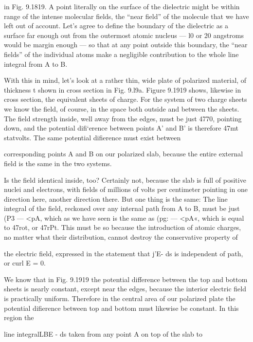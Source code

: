 {%
in Fig. 9.1819. A point literally on the surface of the dielectric might
be within range of the intense molecular fields, the ``near field'' of
the molecule that we have left out of account. Let's agree to define
the boundary of the dielectric as a surface far enough out from the
outermost atomic nucleus --- l0 or 20 angstroms would be margin
enough --- so that at any point outside this boundary, the ``near fields''
of the individual atoms make a negligible contribution to the whole
line integral from A to B.

With this in mind, let's look at a rather thin, wide plate of polarized
material, of thickness t shown in cross section in Fig. 9.l9a. Figure
9.1919 shows, likewise in cross section, the equivalent sheets of charge.
For the system of two charge sheets we know the field, of course, in
the space both outside and between the sheets. The field strength
inside, well away from the edges, must be just 4770, pointing down,
and the potential difi‘erence between points A' and B' is therefore
47mt statvolts. The same potential difierence must exist between

corresponding points A and B on our polarized slab, because the
entire external field is the same in the two systems.

Is the field identical inside, too? Certainly not, because the slab
is full of positive nuclei and electrons, with fields of millions of volts
per centimeter pointing in one direction here, another direction there.
But one thing is the same: The line integral of the field, reckoned over
any internal path from A to B, must be just (P3  ---  <pA, which as we have
seen is the same as (pg:  ---  <pA«, which is equal to 47rot, or 47rPt. This
must be so because the introduction of atomic charges, no matter
what their distribution, cannot destroy the conservative property of

the electric field, expressed in the statement that j'E- ds is independent
of path, or curl E = 0.

 

 
 

We know that in Fig. 9.1919 the potential difference between the
top and bottom sheets is nearly constant, except near the edges, because
the interior electric field is practically uniform. Therefore in
the central area of our polarized plate the potential difierence between
top and bottom must likewise be constant. In this region the

line integralLBE - ds taken from any point A on top of the slab to

}
